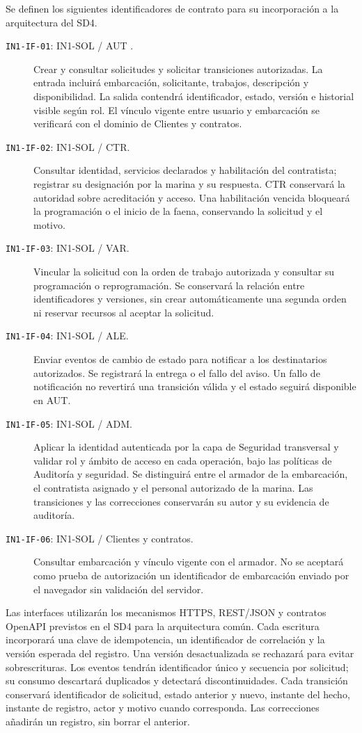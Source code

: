 Se definen los siguientes identificadores de contrato para su incorporación a la arquitectura del SD4.
\begin{description}
\item[\texttt{IN1-IF-01}: IN1-SOL / AUT .] Crear y consultar solicitudes y solicitar transiciones autorizadas. La entrada incluirá embarcación, solicitante, trabajos, descripción y disponibilidad. La salida contendrá identificador, estado, versión e historial visible según rol. El vínculo vigente entre usuario y embarcación se verificará con el dominio de Clientes y contratos.
\item[\texttt{IN1-IF-02}: IN1-SOL / CTR.] Consultar identidad, servicios declarados y habilitación del contratista; registrar su designación por la marina y su respuesta. CTR conservará la autoridad sobre acreditación y acceso. Una habilitación vencida bloqueará la programación o el inicio de la faena, conservando la solicitud y el motivo.
\item[\texttt{IN1-IF-03}: IN1-SOL / VAR.] Vincular la solicitud con la orden de trabajo autorizada y consultar su programación o reprogramación. Se conservará la relación entre identificadores y versiones, sin crear automáticamente una segunda orden ni reservar recursos al aceptar la solicitud.
\item[\texttt{IN1-IF-04}: IN1-SOL / ALE.] Enviar eventos de cambio de estado para notificar a los destinatarios autorizados. Se registrará la entrega o el fallo del aviso. Un fallo de notificación no revertirá una transición válida y el estado seguirá disponible en AUT.
\item[\texttt{IN1-IF-05}: IN1-SOL / ADM.] Aplicar la identidad autenticada por la capa de Seguridad transversal y validar rol y ámbito de acceso en cada operación, bajo las políticas de Auditoría y seguridad. Se distinguirá entre el armador de la embarcación, el contratista asignado y el personal autorizado de la marina. Las transiciones y las correcciones conservarán su autor y su evidencia de auditoría.
\item[\texttt{IN1-IF-06}: IN1-SOL / Clientes y contratos.] Consultar embarcación y vínculo vigente con el armador. No se aceptará como prueba de autorización un identificador de embarcación enviado por el navegador sin validación del servidor.
\end{description}

Las interfaces utilizarán los mecanismos HTTPS, REST/JSON y contratos OpenAPI previstos en el SD4 para la arquitectura común. Cada escritura incorporará una clave de idempotencia, un identificador de correlación y la versión esperada del registro. Una versión desactualizada se rechazará para evitar sobrescrituras. Los eventos tendrán identificador único y secuencia por solicitud; su consumo descartará duplicados y detectará discontinuidades. Cada transición conservará identificador de solicitud, estado anterior y nuevo, instante del hecho, instante de registro, actor y motivo cuando corresponda. Las correcciones añadirán un registro, sin borrar el anterior.

